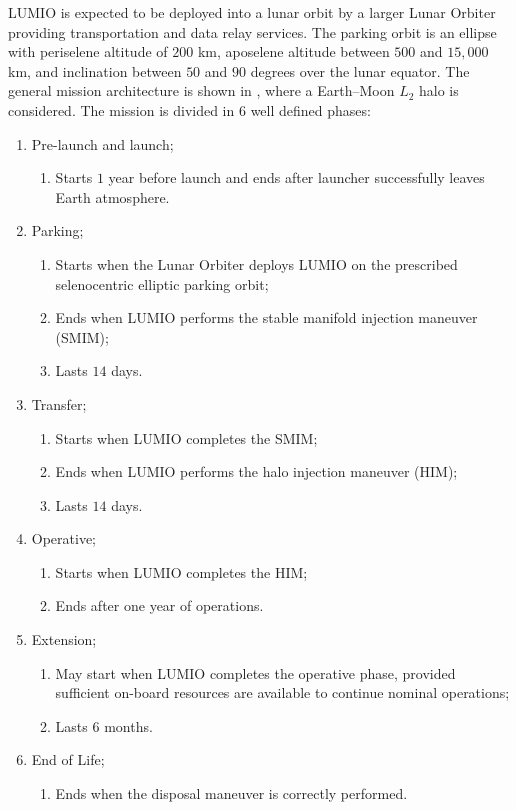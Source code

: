 LUMIO is expected to be deployed into a lunar orbit by a larger Lunar Orbiter providing transportation and data relay services. The parking orbit is an ellipse with periselene altitude of $200$ km, aposelene altitude between $500$ and $15,000$ km, and inclination between $50$ and $90$ degrees over the lunar equator. The general mission architecture is shown in , where a Earth--Moon $L_2$ halo is considered. The mission is divided in $6$ well defined phases:
%
\begin{enumerate}
	\item Pre-launch and launch;
	\begin{enumerate}[{1-}i.]
		\item Starts $1$ year before launch and ends after launcher successfully leaves Earth atmosphere.
	\end{enumerate}
	\item Parking;
	\begin{enumerate}[{2-}i.]
		\item Starts when the Lunar Orbiter deploys LUMIO on the prescribed selenocentric elliptic parking orbit;
		\item Ends when LUMIO performs the stable manifold injection maneuver (SMIM);
		\item Lasts $14$ days.
	\end{enumerate}
	\item Transfer;
	\begin{enumerate}[{3-}i.]
		\item Starts when LUMIO completes the SMIM;
		\item Ends when LUMIO performs the halo injection maneuver (HIM);
		\item Lasts $14$ days.
	\end{enumerate}
	\item Operative;
	\begin{enumerate}[{4-}i.]
		\item Starts when LUMIO completes the HIM;
		\item Ends after one year of operations.
	\end{enumerate}
	\item Extension;
	\begin{enumerate}[{5-}i.]
		\item May start when LUMIO completes the operative phase, provided sufficient on-board resources are available to continue nominal operations;
		\item Lasts $6$ months.
	\end{enumerate}
	\item End of Life;
	\begin{enumerate}[{6-}i.]
		\item Ends when the disposal maneuver is correctly performed.
	\end{enumerate}
\end{enumerate}
%


